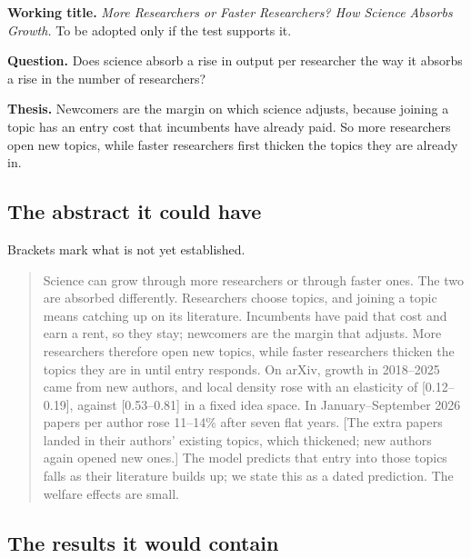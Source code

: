 \begin{keybox}
\textbf{Working title.} \emph{More Researchers or Faster Researchers? How Science Absorbs Growth.} To be adopted only if the test supports it.

\textbf{Question.} Does science absorb a rise in output per researcher the way it absorbs a rise in the number of researchers?

\textbf{Thesis.} Newcomers are the margin on which science adjusts, because joining a topic has an entry cost that incumbents have already paid. So more researchers open new topics, while faster researchers first thicken the topics they are already in.
\end{keybox}

\subsection{The abstract it could have}

Brackets mark what is not yet established.

\begin{quote}\small
Science can grow through more researchers or through faster ones. The two are absorbed differently. Researchers choose topics, and joining a topic means catching up on its literature. Incumbents have paid that cost and earn a rent, so they stay; newcomers are the margin that adjusts. More researchers therefore open new topics, while faster researchers thicken the topics they are in until entry responds. On arXiv, growth in 2018--2025 came from new authors, and local density rose with an elasticity of [0.12--0.19], against [0.53--0.81] in a fixed idea space. In January--September 2026 papers per author rose 11--14\% after seven flat years. [The extra papers landed in their authors' existing topics, which thickened; new authors again opened new ones.] The model predicts that entry into those topics falls as their literature builds up; we state this as a dated prediction. The welfare effects are small.
\end{quote}

\subsection{The results it would contain}

